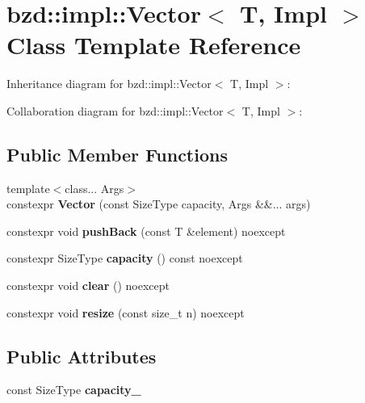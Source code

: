 \hypertarget{classbzd_1_1impl_1_1Vector}{}\section{bzd\+:\+:impl\+:\+:Vector$<$ T, Impl $>$ Class Template Reference}
\label{classbzd_1_1impl_1_1Vector}


Inheritance diagram for bzd\+:\+:impl\+:\+:Vector$<$ T, Impl $>$\+:


Collaboration diagram for bzd\+:\+:impl\+:\+:Vector$<$ T, Impl $>$\+:
\subsection*{Public Member Functions}
\begin{DoxyCompactItemize}
\item 
\mbox{\label{classbzd_1_1impl_1_1Vector_a555fb3184c63f405f1726cdabfb8b99b}} 
{\footnotesize template$<$class... Args$>$ }\\constexpr {\bfseries Vector} (const Size\+Type capacity, Args \&\&... args)
\item 
\mbox{\label{classbzd_1_1impl_1_1Vector_a4c250190d24f469139b8ab60dd8a4872}} 
constexpr void {\bfseries push\+Back} (const T \&element) noexcept
\item 
\mbox{\label{classbzd_1_1impl_1_1Vector_a4ada4048843724246d7cd7577e82f94d}} 
constexpr Size\+Type {\bfseries capacity} () const noexcept
\item 
\mbox{\label{classbzd_1_1impl_1_1Vector_af91b3538f35c7723d2ace99e7aadb45b}} 
constexpr void {\bfseries clear} () noexcept
\item 
\mbox{\label{classbzd_1_1impl_1_1Vector_aa5ec19442f1fb8be95b1f01d2d435a06}} 
constexpr void {\bfseries resize} (const size\+\_\+t n) noexcept
\end{DoxyCompactItemize}
\subsection*{Public Attributes}
\begin{DoxyCompactItemize}
\item 
\mbox{\label{classbzd_1_1impl_1_1Vector_aec6fa1477596bf8b0fd4d4db45a68585}} 
const Size\+Type {\bfseries capacity\+\_\+}
\end{DoxyCompactItemize}
